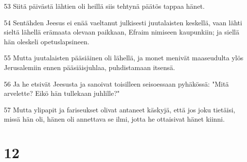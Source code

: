 \par 53 Siitä päivästä lähtien oli heillä siis tehtynä päätös tappaa hänet.
\par 54 Sentähden Jeesus ei enää vaeltanut julkisesti juutalaisten keskellä, vaan lähti sieltä lähellä erämaata olevaan paikkaan, Efraim nimiseen kaupunkiin; ja siellä hän oleskeli opetuslapsineen.
\par 55 Mutta juutalaisten pääsiäinen oli lähellä, ja monet menivät maaseudulta ylös Jerusalemiin ennen pääsiäisjuhlaa, puhdistamaan itsensä.
\par 56 Ja he etsivät Jeesusta ja sanoivat toisilleen seisoessaan pyhäkössä: "Mitä arvelette? Eikö hän tullekaan juhlille?"
\par 57 Mutta ylipapit ja fariseukset olivat antaneet käskyjä, että jos joku tietäisi, missä hän oli, hänen oli annettava se ilmi, jotta he ottaisivat hänet kiinni.

\chapter{12}

